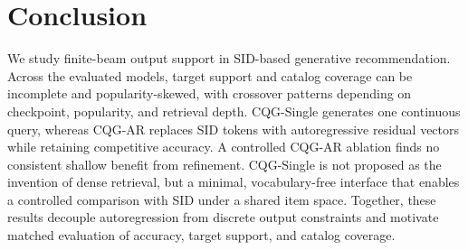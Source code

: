 \documentclass[preprint,12pt]{elsarticle}
\begin{document}
\section{Conclusion}
We study finite-beam output support in SID-based generative recommendation.
Across the evaluated models, target support and catalog coverage can be
incomplete and popularity-skewed, with crossover patterns depending on
checkpoint, popularity, and retrieval depth. CQG-Single generates one
continuous query, whereas CQG-AR replaces SID tokens with autoregressive
residual vectors while retaining competitive accuracy. A controlled CQG-AR
ablation finds no consistent shallow benefit from refinement. CQG-Single is not proposed as the invention of dense retrieval, but a minimal, vocabulary-free interface that enables a controlled comparison with SID under a shared item space.
Together, these results decouple autoregression from discrete output
constraints and motivate matched evaluation of accuracy, target support,
and catalog coverage.


\FloatBarrier

\clearpage
\appendix
\setcounter{secnumdepth}{3}
\end{document}
